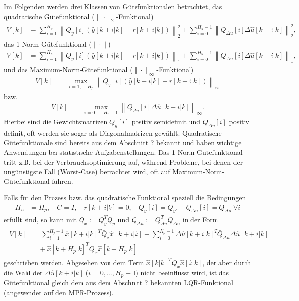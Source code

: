 Im Folgenden werden drei Klassen von Gütefunktionalen betrachtet, das quadratische Gütefunktional ($\|\cdot\|_2$-Funktional)
\begin{align}
V[k] & = \sum\limits_{i=1}^{H_p}\left\|Q_y[i]\left(\hat{y}[k+i|k]-r[k+i|k]\right)\right\|_2^2+\sum\limits_{i=0}^{H_u-1}\left\|Q_{\Delta u}[i]\Delta\hat{u}[k+i|k]\right\|_2^2
\label{eqn:kap_4_quad_guetefunktional},
\end{align}
das 1-Norm-Gütefunktional ($\|\cdot\|$)
\begin{align}
V[k] & = \sum\limits_{i=1}^{H_p}\left\|Q_y[i]\left(\hat{y}[k+i|k]-r[k+i|k]\right)\right\|_1+\sum\limits_{i=0}^{H_u-1}\left\|Q_{\Delta
u}[i]\Delta\hat{u}[k+i|k]\right\|_1,\label{eqn:kap_4_eins_norm_guetefunktional}
\end{align}
und das Maximum-Norm-Gütefunktional ($\|\cdot\|_{\infty}$-Funktional)
\begin{align}
	V[k] & = \max\limits_{i=1,\ldots,H_p}\left\|Q_{y}[i]\left(\hat{y}[k+i|k]-r[k+i|k] \right)\right\|_{\infty}\label{eqn:kap_4_max_norm_guetefunktional_1}
\end{align}
bzw.
\begin{align}
	V[k] & = \max\limits_{i=0,\ldots,H_u-1}\left\|Q_{\Delta u}[i]\Delta\hat{u}[k+i|k] \right\|_{\infty}.\label{eqn:kap_4_max_norm_guetefunktional_2}
\end{align}
Hierbei sind die Gewichtsmatrizen $Q_{y}[i]$ positiv semidefinit und $Q_{\Delta u}[i]$ positiv definit, oft werden sie sogar als Diagonalmatrizen gewählt. Quadratische Gütefunktionale
sind bereits aus dem Abschnitt ? bekannt und haben wichtige Anwendungen bei statistische Aufgabenstellungen. Das 1-Norm-Gütefunktional tritt z.B. bei der Verbrauchsoptimierung auf,
während Probleme, bei denen der ungünstigste Fall (Worst-Case) betrachtet wird, oft auf Maximum-Norm-Gütefunktional führen.
\begin{exmp}\label{exmp:kap_4_bsp_siso_nb}
Falls für den Prozess  bzw. das quadratische Funktional  speziell die Bedingungen 
\begin{align*}
H_u & = H_p,\quad C=I,\quad r[k+i|k]=0,\quad Q_y[i]=Q_y,\quad Q_{\Delta u}[i]=Q_{\Delta u}\ \forall i
\end{align*}
erfüllt sind, so kann  mit $\bar{Q}_x:=Q_y^TQ_y$ und $\bar{Q}_{\Delta u}:=Q^T_{\Delta u}Q_{\Delta u}$ in der Form
\begin{align}
\begin{split}\label{eqn:kap_4_bsp_1_kostenfunktionial}
V[k] & = \sum\limits_{i=1}^{H_p-1}\hat{x}[k+i|k]^T\bar{Q}_{x}\hat{x}[k+i|k]+\sum\limits_{i=0}^{H_p-1}\Delta\hat{u}[k+i|k]^T\bar{Q}_{\Delta u}\Delta\hat{u}[k+i|k]\\
& \quad +\hat{x}[k+H_p|k]^T\bar{Q}_{x}\hat{x}[k+H_p|k]
\end{split}
\end{align}
geschrieben werden. Abgesehen von dem Term $\hat{x}[k|k]^T\bar{Q}_{x}\hat{x}[k|k]$, der aber durch die Wahl der $\Delta\hat{u}[k+i|k]$ ($i=0,\ldots,H_p-1$) nicht beeinflusst wird, ist
das Gütefunktional  gleich dem aus dem Abschnitt ? bekannten \ac{LQR}-Funktional (angewendet auf den \ac{MPR}-Prozess).
\end{exmp}
